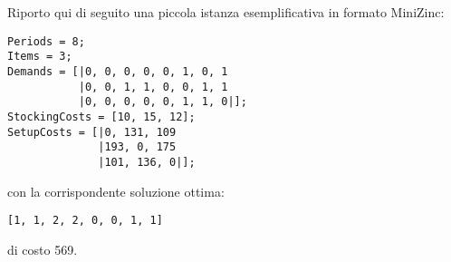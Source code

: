 \documentclass[12pt]{article}
\begin{document}
Riporto qui di seguito una piccola istanza esemplificativa in formato MiniZinc:
\begin{verbatim}
Periods = 8;
Items = 3;
Demands = [|0, 0, 0, 0, 0, 1, 0, 1
           |0, 0, 1, 1, 0, 0, 1, 1
           |0, 0, 0, 0, 0, 1, 1, 0|];
StockingCosts = [10, 15, 12];
SetupCosts = [|0, 131, 109
              |193, 0, 175
              |101, 136, 0|];
\end{verbatim}
con la corrispondente soluzione ottima:
\begin{verbatim}
[1, 1, 2, 2, 0, 0, 1, 1]
\end{verbatim}
di costo 569.
\end{document}
